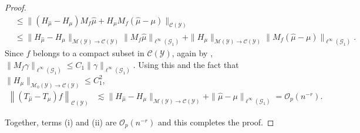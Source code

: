 \documentclass{article}
\theoremstyle{plain}
\theoremstyle{definition}
\theoremstyle{remark}
\newcommand{\cG}{\mathcal{G}}
\newcommand{\cC}{\mathcal{C}}
\newcommand{\cO}{\mathcal{O}}
\newcommand{\cM}{\mathcal{M}}
\newcommand{\cY}{\mathcal{Y}}
\newcommand{\1}{\mathbbm{1}}
\newcommand{\norm}[1]{\left \| #1 \right \|}
\theoremstyle{plain}
\theoremstyle{definition}
\begin{document}
\begin{proof}
\begin{align*}
        &\leq \| (H_{\hat{\mu}} - H_\mu) M_f \hat{\mu} + H_\mu M_f (\hat{\mu} - \mu)\|_{\cC(\cY)}\\
        &\leq \| H_{\hat{\mu}} - H_\mu \|_{\cM(\cY) \to \cC(\cY)} \| M_f \hat{\mu} \|_{ \ell^\infty(\cG_1)} + \|H_\mu\|_{\cM(\cY) \to \cC(\cY)} \|M_f(\hat{\mu} - \mu)\|_{\ell^\infty(\cG_1)}.
    \end{align*}
    Since $f$ belongs to a compact subset in $\cC(\cY)$, again by \citet[Lem.~22]{kokot2025coreset}, $\|M_f \gamma\|_{\ell^\infty(\cG_1)} \leq C_1 \|\gamma\|_{\ell^\infty(\cG_1)}$. Using this and the fact that $\|H_{\mu}\|_{\cM_0(\cY) \to \cC(\cY)} \leq C_1^2$,
    \begin{align*}
         \norm{(T_{\hat{\mu}} - T_\mu) f}_{\cC(\cY)} & \lesssim   \| H_{\hat{\mu}} - H_\mu \|_{\cM(\cY) \to\cC(\cY)} + \|\hat{\mu} - \mu\|_{\ell^\infty(\cG_1)} = \cO_p(n^{-r}).
    \end{align*}
    
    Together, terms (i) and (ii) are $\cO_p(n^{-r})$ and this completes the proof.
\end{proof}
\end{document}
